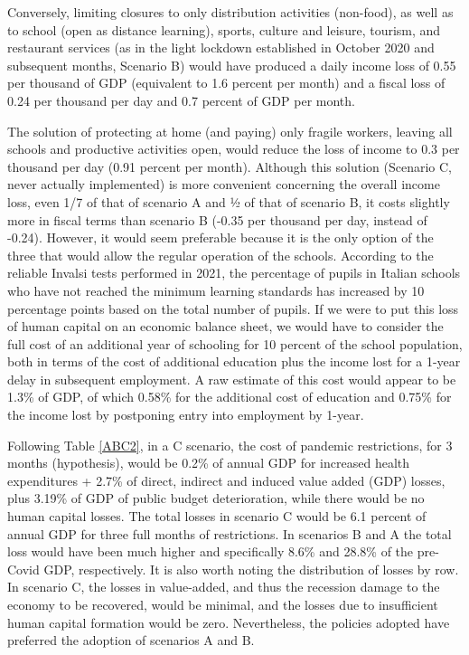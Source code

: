 \documentclass[graybox]{svmult}
\begin{document}
Conversely, limiting closures to only distribution activities (non-food), as well as to school (open as distance learning), sports, culture and leisure, tourism, and restaurant services (as in the light lockdown established in October 2020 and subsequent months, Scenario B) would have produced a daily income loss of 0.55 per thousand of GDP (equivalent to 1.6 percent per month) and a fiscal loss of 0.24 per thousand per day and 0.7 percent of GDP per month. 

The solution of protecting at home (and paying) only fragile workers, leaving all schools and productive activities open, would reduce the loss of income to 0.3 per thousand per day (0.91 percent per month). Although this solution (Scenario C, never actually implemented) is more convenient concerning the overall income loss, even 1/7 of that of scenario A and ½ of that of scenario B, it costs slightly more in fiscal terms than scenario B (-0.35 per thousand per day, instead of -0.24). However, it would seem preferable because it is the only option of the three that would allow the regular operation of the schools. According to the reliable Invalsi tests performed in 2021, the percentage of pupils in Italian schools who have not reached the minimum learning standards has increased by 10 percentage points based on the total number of pupils. If we were to put this loss of human capital on an economic balance sheet, we would have to consider the full cost of an additional year of schooling for 10 percent of the school population, both in terms of the cost of additional education plus the income lost for a 1-year delay in subsequent employment. A raw estimate of this cost would appear to be 1.3\% of GDP, of which 0.58\% for the additional cost of education and 0.75\% for the income lost by postponing entry into employment by 1-year. 

Following Table \ref{ABC2}, in a C scenario, the cost of pandemic restrictions, for 3 months (hypothesis), would be 0.2\% of annual GDP for increased health expenditures + 2.7\% of direct, indirect and induced value added (GDP) losses, plus 3.19\% of GDP of public budget deterioration, while there would be no human capital losses. The total losses in scenario C would be 6.1 percent of annual GDP for three full months of restrictions. In scenarios B and A the total loss would have been much higher and specifically 8.6\% and 28.8\% of the pre-Covid GDP, respectively. It is also worth noting the distribution of losses by row. In scenario C, the losses in value-added, and thus the recession damage to the economy to be recovered, would be minimal, and the losses due to insufficient human capital formation would be zero. Nevertheless, the policies adopted have preferred the adoption of scenarios A and B.
\end{document}

